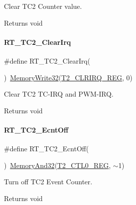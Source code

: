 Clear T\+C2 Counter value. 

\begin{DoxyReturn}{Returns}
void 
\end{DoxyReturn}
\mbox{\label{a00083_a92052b959fbb893385c5adc2c4b00bad}} 
\paragraph{\texorpdfstring{R\+T\+\_\+\+T\+C2\+\_\+\+Clear\+Irq}{RT\_TC2\_ClearIrq}}
{\footnotesize\ttfamily \#define R\+T\+\_\+\+T\+C2\+\_\+\+Clear\+Irq(\begin{DoxyParamCaption}{ }\end{DoxyParamCaption})~\mbox{\hyperlink{a00026_a6b9732365b12e48ddb89fe1028b975b0}{Memory\+Write32}}(\mbox{\hyperlink{a00026_aba8ec9cd37a1487a613cca0194e62f15}{T2\+\_\+\+C\+L\+R\+I\+R\+Q\+\_\+\+R\+EG}}, 0)}



Clear T\+C2 T\+C-\/\+I\+RQ and P\+W\+M-\/\+I\+RQ. 

\begin{DoxyReturn}{Returns}
void 
\end{DoxyReturn}
\mbox{\label{a00083_af77e205baae8e267fda5374c167ab76c}} 
\paragraph{\texorpdfstring{R\+T\+\_\+\+T\+C2\+\_\+\+Ecnt\+Off}{RT\_TC2\_EcntOff}}
{\footnotesize\ttfamily \#define R\+T\+\_\+\+T\+C2\+\_\+\+Ecnt\+Off(\begin{DoxyParamCaption}{ }\end{DoxyParamCaption})~\mbox{\hyperlink{a00026_ad87cedffcaadc51db22594fce55173d4}{Memory\+And32}}(\mbox{\hyperlink{a00026_a5853553391e986211306d4f29ab31e47}{T2\+\_\+\+C\+T\+L0\+\_\+\+R\+EG}}, $\sim$1)}



Turn off T\+C2 Event Counter. 

\begin{DoxyReturn}{Returns}
void 
\end{DoxyReturn}
\mbox{\label{a00083_a261544e2cbdbdeee0d22734b29827cd2}} 
